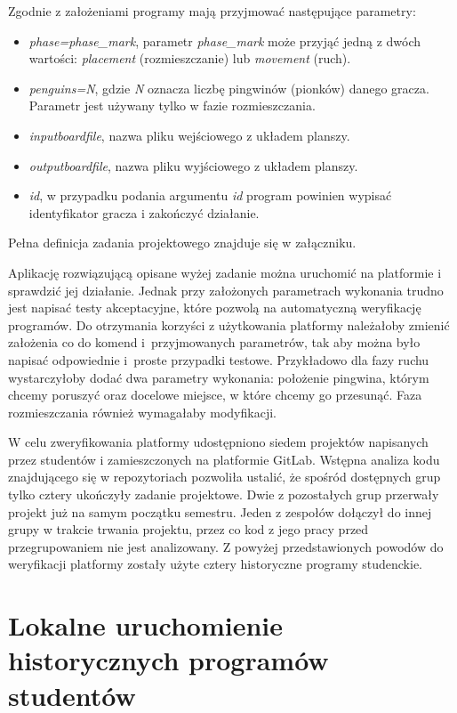 Zgodnie z założeniami programy mają przyjmować następujące parametry:
\begin{itemize}
    \item \textit{phase=phase\_mark}, parametr \textit{phase\_mark} może przyjąć jedną z dwóch wartości: \textit{placement} (rozmieszczanie) lub \textit{movement} (ruch).
    \item \textit{penguins=N}, gdzie \textit{N} oznacza liczbę pingwinów (pionków) danego gracza.
    Parametr jest używany tylko w fazie rozmieszczania.
    \item \textit{inputboardfile}, nazwa pliku wejściowego z układem planszy.
    \item \textit{outputboardfile}, nazwa pliku wyjściowego z układem planszy.
    \item \textit{id}, w przypadku podania argumentu \textit{id} program powinien wypisać identyfikator gracza i zakończyć działanie.
\end{itemize}
Pełna definicja zadania projektowego znajduje się w załączniku.

Aplikację rozwiązującą opisane wyżej zadanie można uruchomić na platformie i sprawdzić jej działanie.
Jednak przy założonych parametrach wykonania trudno jest napisać testy akceptacyjne, które pozwolą na automatyczną weryfikację programów.
Do otrzymania korzyści z użytkowania platformy należałoby zmienić założenia co do komend i~przyjmowanych parametrów, tak aby można było napisać odpowiednie i~proste przypadki testowe.
Przykładowo dla fazy ruchu wystarczyłoby dodać dwa parametry wykonania: położenie pingwina, którym chcemy poruszyć oraz docelowe miejsce, w które chcemy go przesunąć.
Faza rozmieszczania również wymagałaby modyfikacji.

W celu zweryfikowania platformy udostępniono siedem projektów napisanych przez studentów i zamieszczonych na platformie GitLab.
Wstępna analiza kodu znajdującego się w repozytoriach pozwoliła ustalić, że spośród dostępnych grup tylko cztery ukończyły zadanie projektowe.
Dwie z pozostałych grup przerwały projekt już na samym początku semestru.
Jeden z zespołów dołączył do innej grupy w trakcie trwania projektu, przez co kod z jego pracy przed przegrupowaniem nie jest analizowany.
Z powyżej przedstawionych powodów do weryfikacji platformy zostały użyte cztery historyczne programy studenckie.

\section{Lokalne uruchomienie historycznych programów studentów}

